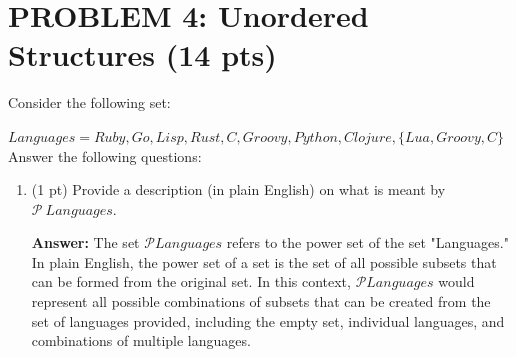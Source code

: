 \documentclass[12pt]{article}
\begin{document}
\begin{spacing}{1.5}
\begin{enumerate}
\begin{center}
		      			      			      			      			      	
		      \end{center}
		      		      		      		      		        
	\end{enumerate}	    
	\newpage
	\section*{PROBLEM 4: Unordered Structures (14 pts)}
					
	Consider the following set:
				
	$Languages=Ruby, Go, Lisp, Rust, C, Groovy, Python, Clojure, \{Lua, Groovy, C\}$\\
				
	Answer the following questions:
				
	\begin{enumerate}
		\item (1 pt) Provide a description (in plain English) on what is meant by $\mathcal{P} \: Languages$.
		      		      		      		      
		      \textbf{Answer:} The set $\mathcal{P} Languages$ refers to the power set of the set "Languages." In plain English, the power set of a set is the set of all possible subsets that can be formed from the original set. In this context, $\mathcal{P} Languages$ would represent all possible combinations of subsets that can be created from the set of languages provided, including the empty set, individual languages, and combinations of multiple languages.\\
		      		      		      		      

\end{enumerate}
\end{spacing}
\end{document}
